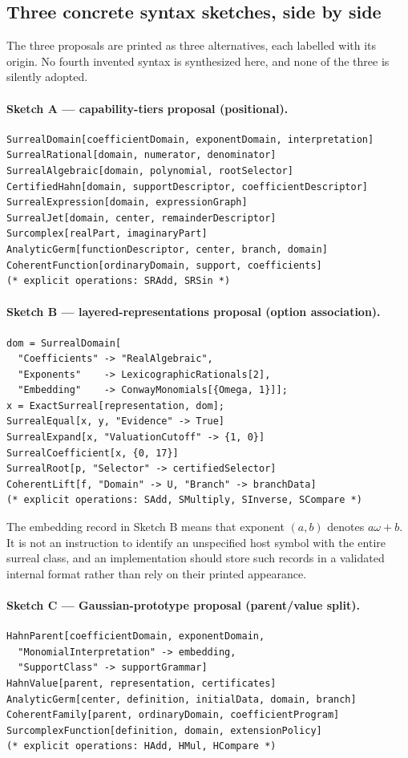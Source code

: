 \documentclass[11pt,letterpaper]{article}
\numberwithin{equation}{section}
\theoremstyle{definition}
\theoremstyle{remark}
\begin{document}
\subsection{Three concrete syntax sketches, side by side}
\label{cas:sub-sketches}
The three proposals are printed as three alternatives, each labelled with its
origin. No fourth invented syntax is synthesized here, and none of the three is
silently adopted.

\paragraph{Sketch A --- capability-tiers proposal (positional).}
\begin{lstlisting}
SurrealDomain[coefficientDomain, exponentDomain, interpretation]
SurrealRational[domain, numerator, denominator]
SurrealAlgebraic[domain, polynomial, rootSelector]
CertifiedHahn[domain, supportDescriptor, coefficientDescriptor]
SurrealExpression[domain, expressionGraph]
SurrealJet[domain, center, remainderDescriptor]
Surcomplex[realPart, imaginaryPart]
AnalyticGerm[functionDescriptor, center, branch, domain]
CoherentFunction[ordinaryDomain, support, coefficients]
(* explicit operations: SRAdd, SRSin *)
\end{lstlisting}

\paragraph{Sketch B --- layered-representations proposal (option association).}
\begin{lstlisting}
dom = SurrealDomain[
  "Coefficients" -> "RealAlgebraic",
  "Exponents"    -> LexicographicRationals[2],
  "Embedding"    -> ConwayMonomials[{Omega, 1}]];
x = ExactSurreal[representation, dom];
SurrealEqual[x, y, "Evidence" -> True]
SurrealExpand[x, "ValuationCutoff" -> {1, 0}]
SurrealCoefficient[x, {0, 17}]
SurrealRoot[p, "Selector" -> certifiedSelector]
CoherentLift[f, "Domain" -> U, "Branch" -> branchData]
(* explicit operations: SAdd, SMultiply, SInverse, SCompare *)
\end{lstlisting}
The embedding record in Sketch B means that exponent $(a,b)$ denotes
$a\omega+b$. It is not an instruction to identify an unspecified host symbol
with the entire surreal class, and an implementation should store such records
in a validated internal format rather than rely on their printed appearance.

\paragraph{Sketch C --- Gaussian-prototype proposal (parent/value split).}
\begin{lstlisting}
HahnParent[coefficientDomain, exponentDomain,
  "MonomialInterpretation" -> embedding,
  "SupportClass" -> supportGrammar]
HahnValue[parent, representation, certificates]
AnalyticGerm[center, definition, initialData, domain, branch]
CoherentFamily[parent, ordinaryDomain, coefficientProgram]
SurcomplexFunction[definition, domain, extensionPolicy]
(* explicit operations: HAdd, HMul, HCompare *)
\end{lstlisting}
\end{document}

